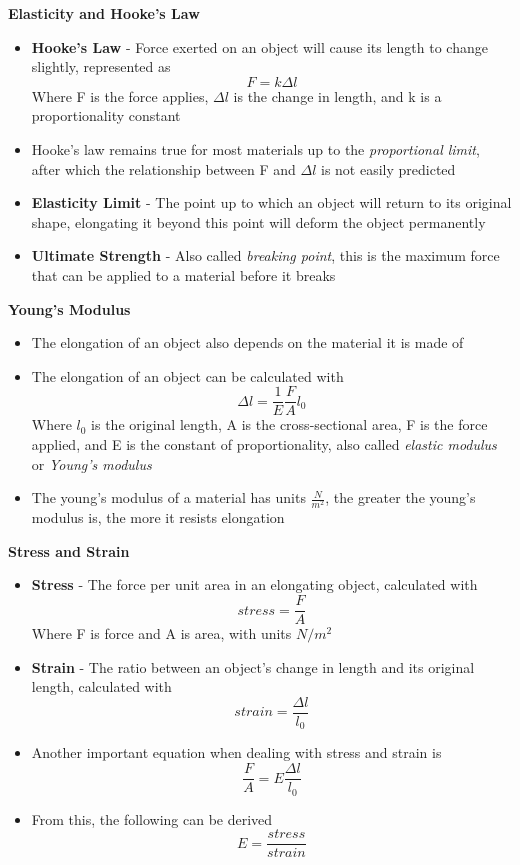 \textbf{Elasticity and Hooke's Law}
\begin{itemize}
    \item \textbf{Hooke's Law} - Force exerted on an object will cause its length to change slightly, represented as \[F=k\Delta l\] Where F is the force applies, \(\Delta l\) is the change in length, and k is a proportionality constant
    \item Hooke's law remains true for most materials up to the \emph{proportional limit}, after which the relationship between F and \(\Delta l\) is not easily predicted
    \item \textbf{Elasticity Limit} - The point up to which an object will return to its original shape, elongating it beyond this point will deform the object permanently
    \item \textbf{Ultimate Strength} - Also called \emph{breaking point}, this is the maximum force that can be applied to a material before it breaks
\end{itemize}

\textbf{Young's Modulus}
\begin{itemize}
    \item The elongation of an object also depends on the material it is made of
    \item The elongation of an object can be calculated with \[\Delta l=\frac{1}{E}\frac{F}{A}l_0\] Where \(l_0\) is the original length, A is the cross-sectional area, F is the force applied, and E is the constant of proportionality, also called \emph{elastic modulus} or \emph{Young's modulus}
    \item The young's modulus of a material has units \(\frac{N}{m^2}\), the greater the young's modulus is, the more it resists elongation
\end{itemize}

\textbf{Stress and Strain}
\begin{itemize}
    \item \textbf{Stress} - The force per unit area in an elongating object, calculated with \[stress=\frac{F}{A}\] Where F is force and A is area, with units \(N/m^2\)
    \item \textbf{Strain} - The ratio between an object's change in length and its original length, calculated with \[strain=\frac{\Delta l}{l_0}\]
    \item Another important equation when dealing with stress and strain is \[\frac{F}{A}=E\frac{\Delta l}{l_0}\]
    \item From this, the following can be derived \[E=\frac{stress}{strain}\]
\end{itemize}

